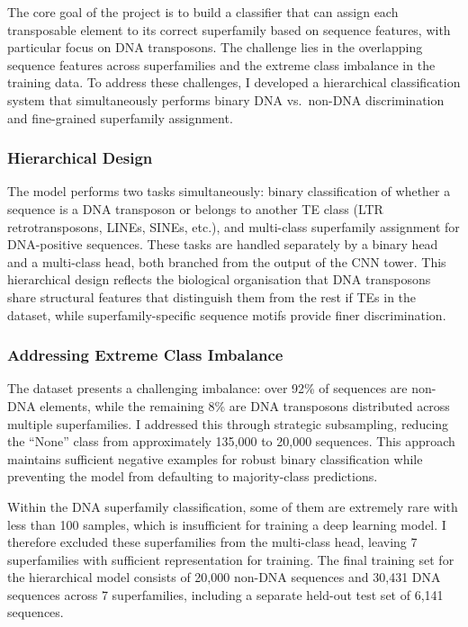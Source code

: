 \documentclass[12pt]{article}
\begin{document}
The core goal of the project is to build a classifier that can assign each transposable element to its correct superfamily based on sequence features, with particular focus on DNA transposons. The challenge lies in the overlapping sequence features across superfamilies and the extreme class imbalance in the training data. To address these challenges, I developed a hierarchical classification system that simultaneously performs binary DNA vs.\ non-DNA discrimination and fine-grained superfamily assignment.

\subsubsection{Hierarchical Design}

The model performs two tasks simultaneously: binary classification of whether a sequence is a DNA transposon or belongs to another TE class (LTR retrotransposons, LINEs, SINEs, etc.), and multi-class superfamily assignment for DNA-positive sequences. These tasks are handled separately by a binary head and a multi-class head, both branched from the output of the CNN tower. This hierarchical design reflects the biological organisation that DNA transposons share structural features that distinguish them from the rest if TEs in the dataset, while superfamily-specific sequence motifs provide finer discrimination. 

\subsubsection{Addressing Extreme Class Imbalance}

The dataset presents a challenging imbalance: over 92\% of sequences are non-DNA elements, while the remaining 8\% are DNA transposons distributed across multiple superfamilies. I addressed this through strategic subsampling, reducing the ``None'' class from approximately 135,000 to 20,000 sequences. This approach maintains sufficient negative examples for robust binary classification while preventing the model from defaulting to majority-class predictions.

Within the DNA superfamily classification, some of them are extremely rare with less than 100 samples, which is insufficient for training a deep learning model. I therefore excluded these superfamilies from the multi-class head, leaving 7 superfamilies with sufficient representation for training. The final training set for the hierarchical model consists of 20,000 non-DNA sequences and 30,431 DNA sequences across 7 superfamilies, including a separate held-out test set of 6,141 sequences. 
\end{document}
